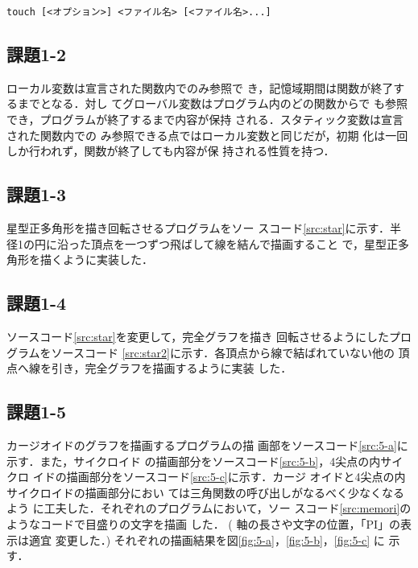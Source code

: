 \documentclass[twocolumn]{jsarticle}%
\begin{document}
\begin{lstlisting}[numbers=none]
touch [<オプション>] <ファイル名> [<ファイル名>...] 
\end{lstlisting}

\subsection{課題1-2}
ローカル変数は宣言された関数内でのみ参照で
き，記憶域期間は関数が終了するまでとなる．対し
てグローバル変数はプログラム内のどの関数からで
も参照でき，プログラムが終了するまで内容が保持
される．スタティック変数は宣言された関数内での
み参照できる点ではローカル変数と同じだが，初期
化は一回しか行われず，関数が終了しても内容が保
持される性質を持つ．

\subsection{課題1-3}
星型正多角形を描き回転させるプログラムをソー
スコード\ref{src:star}に示す．半径1の円に沿った頂点を一つずつ飛ばして線を結んで描画すること
で，星型正多角形を描くように実装した．



\subsection{課題1-4}
ソースコード\ref{src:star}を変更して，完全グラフを描き
回転させるようにしたプログラムをソースコード
\ref{src:star2}に示す．各頂点から線で結ばれていない他の
頂点へ線を引き，完全グラフを描画するように実装
した．
\newpage


\subsection{課題1-5}
カージオイドのグラフを描画するプログラムの描
画部をソースコード\ref{src:5-a}に示す．また，サイクロイド
の描画部分をソースコード\ref{src:5-b}，4尖点の内サイクロ
イドの描画部分をソースコード\ref{src:5-c}に示す．カージ
オイドと4尖点の内サイクロイドの描画部分におい
ては三角関数の呼び出しがなるべく少なくなるよう
に工夫した．それぞれのプログラムにおいて，ソー
スコード\ref{src:memori}のようなコードで目盛りの文字を描画
した． ( 軸の長さや文字の位置，「PI」の表示は適宜
変更した．) それぞれの描画結果を図\ref{fig:5-a}，\ref{fig:5-b}，\ref{fig:5-c} に
示す．



\vspace{1cm}

\end{document}
